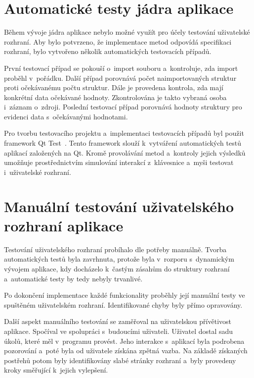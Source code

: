 	\section*{Automatické testy jádra aplikace}
	Během vývoje jádra aplikace nebylo možné využít pro účely testování uživatelské rozhraní. Aby bylo potvrzeno, že implementace metod odpovídá specifikaci rozhraní, bylo vytvořeno několik automatických testovacích případů. \par
	První testovací případ se pokouší o~import souboru a~kontroluje, zda import proběhl v~pořádku. Další případ porovnává počet naimportovaných struktur proti očekávanému počtu struktur. Dále je provedena kontrola, zda mají konkrétní data očekávané hodnoty. Zkontrolována je takto vybraná osoba i~záznam o~zdroji. Poslední testovací případ porovnává hodnoty struktury pro evidenci data s~očekávanými hodnotami.\par
	Pro tvorbu testovacího projektu a~implementaci testovacích případů byl použit framework Qt Test~\cite{bib:QtTest}. Tento framework slouží k~vytváření automatických testů aplikací založených na Qt. Kromě provolávání metod a~kontroly jejich výsledků umožňuje prostřednictvím simulování interakcí z~klávesnice a~myši testovat i~uživatelské rozhraní.\par
		
	\section*{Manuální testování uživatelského rozhraní aplikace}
	Testování uživatelského rozhraní probíhalo dle potřeby manuálně. Tvorba automatických testů byla zavrhnuta, protože byla v~rozporu s~dynamickým vývojem aplikace, kdy docházelo k~častým zásahům do struktury rozhraní a~automatické testy by tedy nebyly trvanlivé.\par
	Po dokončení implementace každé funkcionality proběhly její manuální testy ve spuštěném uživatelském rozhraní. Identifikované chyby byly přímo opravovány.\par
	Další aspekt manuálního testování se zaměřoval na uživatelskou přívětivost aplikace. Spočíval ve spolupráci s~budoucími uživateli. Uživatel dostal sadu úkolů, které měl v~programu provést. Jeho interakce s~aplikací byla podrobena pozorování a~poté byla od uživatele získána zpětná vazba. Na základě získaných postřehů potom byly identifikovány slabé stránky rozhraní a~byly provedeny kroky směřující k~jejich vylepšení.\par
	
	
